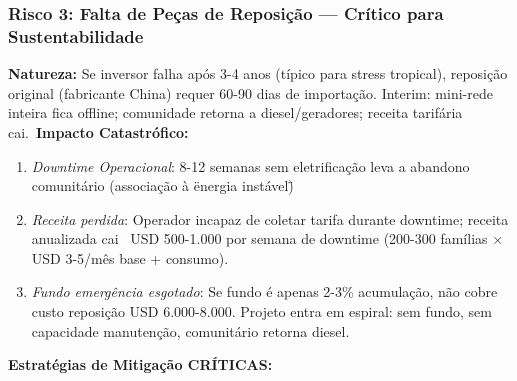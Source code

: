 \documentclass[12pt, a4paper]{article}
\begin{document}
\subsubsection{Risco 3: Falta de Peças de Reposição — Crítico para Sustentabilidade}
\textbf{Natureza:} Se inversor falha após 3-4 anos (típico para stress tropical), reposição original (fabricante China) requer 60-90 dias de importação. Interim: mini-rede inteira fica offline; comunidade retorna a diesel/geradores; receita tarifária cai.\
\textbf{Impacto Catastrófico:} \
\begin{enumerate}
\item\textit{Downtime Operacional}: 8-12 semanas sem eletrificação leva a abandono comunitário (associação à \"energia instável\")\

\item\textit{Receita perdida}: Operador incapaz de coletar tarifa durante downtime; receita anualizada cai ~USD 500-1.000 por semana de downtime (200-300 famílias × USD 3-5/mês base + consumo).\

\item\textit{Fundo emergência esgotado}: Se fundo é apenas 2-3\% acumulação, não cobre custo reposição USD 6.000-8.000. Projeto entra em espiral: sem fundo, sem capacidade manutenção, comunitário retorna diesel.\
\end{enumerate}\textbf{Estratégias de Mitigação CRÍTICAS:}\
\end{document}
